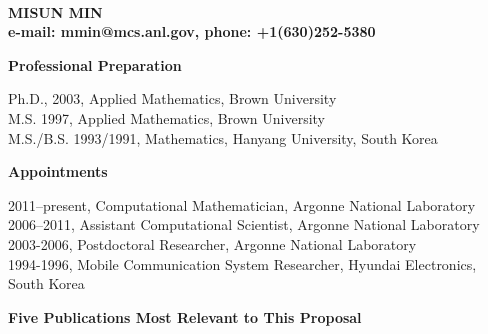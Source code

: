 \documentclass[11pt,letterpaper,english]{article}
\begin{document}
\setlength{\parindent}{0in} %

\pagestyle{fancy}   \renewcommand{%
\headrulewidth}{0.0pt}

\\
{\bf MISUN MIN}\\
{\bf e-mail: mmin@mcs.anl.gov, phone: +1(630)252-5380} \smallskip

\begin{flushleft} {\bf Professional Preparation}
{\parindent 16pt

Ph.D., 2003, Applied Mathematics, Brown University \\
M.S. 1997, Applied Mathematics, Brown University \\
M.S./B.S. 1993/1991, Mathematics, Hanyang University, South Korea \\
}

\vspace{.04in}
{\bf Appointments}
{\parindent 16pt

2011--present, Computational Mathematician, Argonne National Laboratory \\
2006--2011, Assistant Computational Scientist, Argonne National Laboratory\\
2003-2006, Postdoctoral Researcher, Argonne National Laboratory\\
1994-1996, Mobile Communication System Researcher, Hyundai Electronics, South Korea\\
}

\vspace{.04in}
{\bf Five Publications Most Relevant to This Proposal}
\vspace{-6pt}
\begin{enumerate} \itemsep1pt \parskip0pt 


\end{enumerate}
\end{flushleft}
\end{document}
